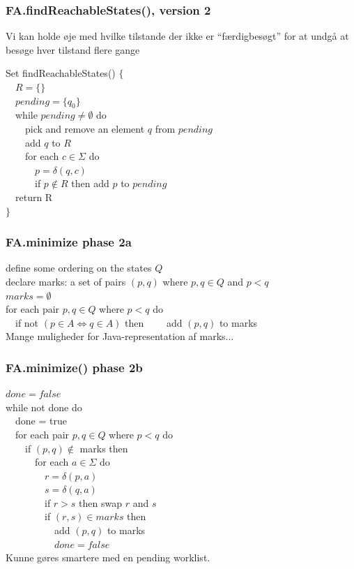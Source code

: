 \documentclass[]{beamer}
\begin{document}
\begin{frame}
\frametitle{FA.findReachableStates(), version 2}

Vi kan holde øje med hvilke tilstande der ikke er ``færdigbesøgt'' for
at undgå at besøge hver tilstand flere gange

Set findReachableStates() $\{$\\
\ \ $R = \{ \}$\\
\ \ $pending = \{ q_0 \}$\\
\ \ while $pending\neq \emptyset$ do\\
\ \ \ \ pick and remove an element $q$ from $pending$\\
\ \ \ \ add $q$ to $R$\\
\ \ \ \ for each $c\in \Sigma$  do\\
\ \ \ \ \ \ $p = \delta(q, c)$\\
\ \ \ \ \ \ if $p\not\in R$ then add $p$ to $pending$\\
\ \ return R\\
$\}$\\
\end{frame}

\begin{frame}
\frametitle{FA.minimize phase 2a}
define some ordering on the states $Q$ \\
declare marks: a set of pairs $(p,q)$ where $p,q\in Q$ and $p<q$\\
$marks=\emptyset$ \\
for each pair $p,q\in Q$ where $p<q$ do\\
\ \ if not $(p\in A \Leftrightarrow q\in A)$ then
\ \ \ \ add $(p,q)$ to marks
\pause \\
Mange muligheder for Java-representation af marks...
\end{frame}

\begin{frame}
\frametitle{FA.minimize() phase 2b}
$done = false$\\
while not done do\\
\ \ done = true\\
\ \ for each pair $p,q\in Q$ where $p<q$ do\\
\ \ \ \  if $(p,q)\not\in$ marks then\\
\ \ \ \ \ \ for each $a\in \Sigma$  do\\
\ \ \ \ \ \ \ \ $r = \delta (p, a)$\\
\ \ \ \ \ \ \ \ $s = \delta (q, a)$\\
\ \ \ \ \ \ \ \ if $r >s$ then swap $r$ and $s$\\
\ \ \ \ \ \ \ \ if $(r,s)\in marks$ then\\
\ \ \ \ \ \ \ \ \ \ add $(p,q)$ to marks\\
\ \ \ \ \ \ \ \ \ \ $done = false$
\\ \pause Kunne gøres smartere med en pending worklist.
\end{frame}
\end{document}
